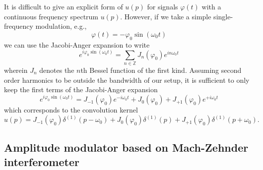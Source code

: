 It is difficult to give an explicit form of $u(p)$ for signals $\varphi(t)$ with a continuous frequency spectrum $u(p)$.
However, if we take a simple single-frequency modulation, e.g.,
\begin{equation}
	\varphi(t)
	=
	-
	\varphi_0
	\sin(\omega_0t)
\end{equation}
we can use the Jacobi-Anger expansion to write
\begin{equation}
	e^{i\varphi_0\sin(\omega_0t)}
	=
	\sum_{n\in\mathbb{Z}}
	J_n(\varphi_0)
	e^{in\omega_0 t}
\end{equation}
wherein $J_n$ denotes the $n$th Bessel function of the first kind.
Assuming second order harmonics to be outside the bandwidth of our setup, it is sufficient to only keep the first terms of the Jacobi-Anger expansion
\begin{equation}
	e^{i\varphi_0\sin(\omega_0t)}
	=
	J_{-1}(\varphi_0)
	e^{-i\omega_0t}
	+
	J_0(\varphi_0)
	+
	J_{+1}(\varphi_0)
	e^{+i\omega_0t}
\end{equation}
which corresponds to the convolution kernel
\begin{equation}
	u(p)
	=
	J_{-1}(\varphi_0)
	\delta^{(1)}(p-\omega_0)
	+
	J_0(\varphi_0)
	\delta^{(1)}(p)
	+
	J_{+1}(\varphi_0)
	\delta^{(1)}(p+\omega_0)
	.
\end{equation}

\subsection{Amplitude modulator based on Mach-Zehnder interferometer}

